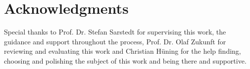 %
\chapter{Acknowledgments}

Special thanks to Prof. Dr. Stefan Sarstedt for supervising this work, the guidance and support throughout the process, Prof. Dr. Olaf Zukunft for reviewing and evaluating this work and Christian Hüning for the help finding, choosing and polishing the subject of this work and being there and supportive.